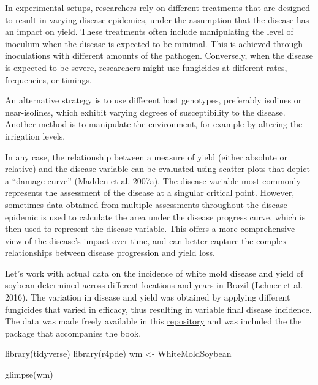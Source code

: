 \documentclass[
  letterpaper,
]{book}
\newenvironment{Shaded}{\begin{snugshade}}{\end{snugshade}}
\newcommand{\FunctionTok}[1]{\textcolor[rgb]{0.28,0.35,0.67}{#1}}
\newcommand{\NormalTok}[1]{\textcolor[rgb]{0.00,0.23,0.31}{#1}}
\newcommand{\OtherTok}[1]{\textcolor[rgb]{0.00,0.23,0.31}{#1}}
\begin{document}
In experimental setups, researchers rely on different treatments that
are designed to result in varying disease epidemics, under the
assumption that the disease has an impact on yield. These treatments
often include manipulating the level of inoculum when the disease is
expected to be minimal. This is achieved through inoculations with
different amounts of the pathogen. Conversely, when the disease is
expected to be severe, researchers might use fungicides at different
rates, frequencies, or timings.

An alternative strategy is to use different host genotypes, preferably
isolines or near-isolines, which exhibit varying degrees of
susceptibility to the disease. Another method is to manipulate the
environment, for example by altering the irrigation levels.

In any case, the relationship between a measure of yield (either
absolute or relative) and the disease variable can be evaluated using
scatter plots that depict a ``damage curve'' (Madden et al. 2007a). The
disease variable most commonly represents the assessment of the disease
at a singular critical point. However, sometimes data obtained from
multiple assessments throughout the disease epidemic is used to
calculate the area under the disease progress curve, which is then used
to represent the disease variable. This offers a more comprehensive view
of the disease's impact over time, and can better capture the complex
relationships between disease progression and yield loss.

Let's work with actual data on the incidence of white mold disease and
yield of soybean determined across different locations and years in
Brazil (Lehner et al. 2016). The variation in disease and yield was
obtained by applying different fungicides that varied in efficacy, thus
resulting in variable final disease incidence. The data was made freely
available in this
\href{https://github.com/emdelponte/paper-white-mold-meta-analysis}{repository}
and was included the the package that accompanies the book.

\begin{Shaded}
\begin{Highlighting}[]
\FunctionTok{library}\NormalTok{(tidyverse)}
\FunctionTok{library}\NormalTok{(r4pde)}
\NormalTok{wm }\OtherTok{\textless{}{-}}\NormalTok{ WhiteMoldSoybean}

\FunctionTok{glimpse}\NormalTok{(wm)}
\end{Highlighting}
\end{Shaded}
\end{document}
